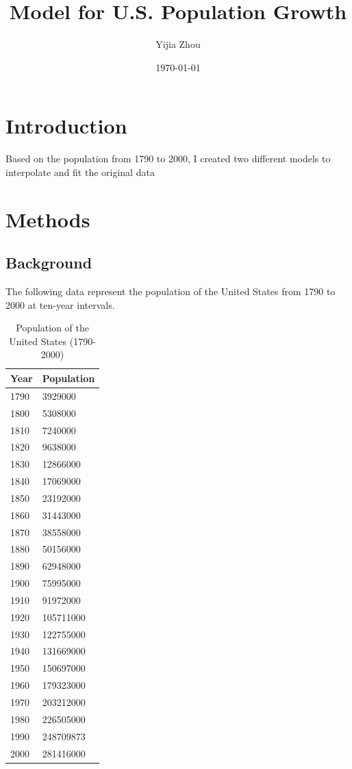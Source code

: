 \documentclass[11pt]{article}
\title{Model for U.S. Population Growth}
\author{Yijia Zhou}
\date{\today}
\begin{document}
\maketitle


\section{Introduction}
Based on the population from 1790 to 2000, I created two different models to interpolate and fit the original data

\section{Methods}
\subsection{Background}
The following data represent the population of the United States from 1790 to 2000 at ten-year intervals.

\begin{table}[H]
    \centering
    \begin{tabular}{ll}
        \toprule
        Year & Population \\
        \midrule
        1790 & 3929000 \\
        1800 & 5308000 \\
        1810 & 7240000 \\
        1820 & 9638000 \\
        1830 & 12866000 \\
        1840 & 17069000 \\
        1850 & 23192000 \\
        1860 & 31443000 \\
        1870 & 38558000 \\
        1880 & 50156000 \\
        1890 & 62948000 \\
        1900 & 75995000 \\
        1910 & 91972000 \\
        1920 & 105711000 \\
        1930 & 122755000 \\
        1940 & 131669000 \\
        1950 & 150697000 \\
        1960 & 179323000 \\
        1970 & 203212000 \\
        1980 & 226505000 \\
        1990 & 248709873 \\
        2000 & 281416000 \\
        \bottomrule
    \end{tabular}
    \caption{Population of the United States (1790-2000)}
\end{table}
\end{document}
